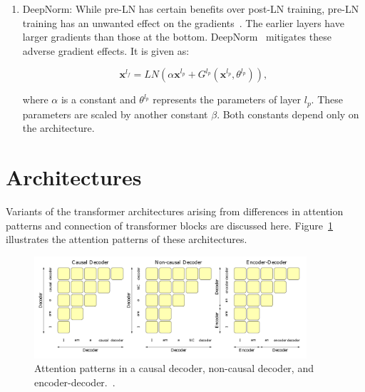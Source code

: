 \documentclass[a4paper,oneside]{book}
\begin{document}
\begin{enumerate}
    \item DeepNorm: While pre-LN has certain benefits over post-LN training, pre-LN training has an unwanted effect on the gradients~\cite{shleifer2021normformer}. The earlier layers have larger gradients than those at the bottom. DeepNorm~\cite{wang2022deepnet} mitigates these adverse gradient effects. It is given as:

          \begin{equation}
              \mathbf{x}^{l_{f}} = LN\left(\alpha \mathbf{x}^{l_{p}}+G^{l_{p}}\left(\mathbf{x}^{l_{p}}, \theta^{l_{p}}\right)\right),
          \end{equation}

          where $\alpha$ is a constant and $\theta^{l_{p}}$ represents the parameters of layer $l_{p}$. These parameters are scaled by another constant $\beta$. Both constants depend only on the architecture.
\end{enumerate}

\section{Architectures}
Variants of the transformer architectures arising from differences in attention patterns and connection of transformer blocks are discussed here. Figure~\ref{fig:attention_patterns} illustrates the attention patterns of these architectures.

\begin{figure}[!htb]
    \centering
    \includegraphics[width=0.9\textwidth]{img/attention_patterns}
    \caption{Attention patterns in a causal decoder, non-causal decoder, and encoder-decoder.~\cite{wang2022language}.}\label{fig:attention_patterns}
\end{figure}
\end{document}
